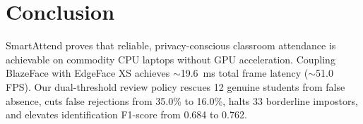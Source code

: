 \documentclass[conference]{IEEEtran}
\begin{document}
\section{Conclusion}
SmartAttend proves that reliable, privacy-conscious classroom attendance is achievable on commodity CPU laptops without GPU acceleration. Coupling BlazeFace with EdgeFace XS achieves $\sim$19.6~ms total frame latency ($\sim$51.0 FPS). Our dual-threshold review policy rescues 12 genuine students from false absence, cuts false rejections from 35.0\% to 16.0\%, halts 33 borderline impostors, and elevates identification F1-score from 0.684 to 0.762.



\end{document}
